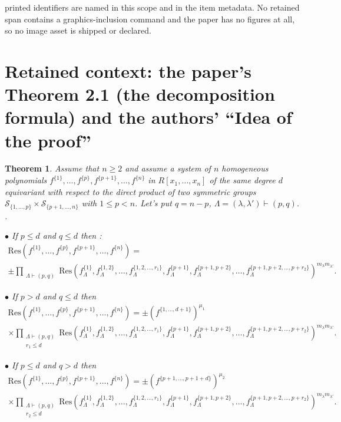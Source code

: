 \documentclass[10pt,a4paper]{amsart}
\newcommand{\Res}{\mathrm{Res}}
\newtheorem{theorem}{Theorem}
\begin{document}
printed identifiers are named in this scope and in the item metadata. No retained span contains a graphics-inclusion command and the paper has no figures at all, so no image asset is shipped or declared.
\section*{Retained context: the paper's Theorem 2.1 (the decomposition formula) and the authors' ``Idea of the proof''}
\begin{theorem}\label{thm:maintheorem} Assume that $n\geq 2$ and  assume a system of $n$ homogeneous polynomials $f^{\{1\}},\ldots, f^{\{p\}}, f^{\{p+1\}},\ldots, f^{\{n\}}$ in $R[x_1,\ldots,x_n]$ of the same degree $d$ equivariant with respect to the direct product of two symmetric groups  $\mathcal{S}_{\{1
,\ldots,p\}}\times\mathcal{S}_{\{p+1
,\ldots,n\}} $ with $1\leq p<n$. Let's put $q=n-p$, $\Lambda=(\lambda, \lambda')\vdash (p, q)$. 
. 

\noindent $\bullet$ If $p\leq d$ and $q\leq d$ then :
\begin{multline*}
\Res\left(f^{\{1\}},\ldots,f^{\{p\}},f^{\{p+1\}},\ldots,f^{\{n\}}\right)=\\ \pm
 \prod_{\substack{\Lambda\vdash (p,q)}}
\Res\left( f_{\Lambda}^{\{1\}}, f_{\Lambda}^{\{1,2\}}, \ldots, f_{\Lambda}^{\{1,2,\ldots,r_1\}},f_{\Lambda}^{\{p+1\}}, f_{\Lambda}^{\{p+1,p+2\}}, \ldots, f_{\Lambda}^{\{p+1,p+2,\ldots,p+r_2\}} 
\right)^{m_{\lambda}m_{\lambda'}}.
\end{multline*}


\noindent $\bullet$ If $p> d$ and $q\leq d$ then
\begin{multline*}
\Res\left(f^{\{1\}},\ldots,f^{\{p\}},f^{\{p+1\}},\ldots,f^{\{n\}}\right)=
 \pm \left(f^{\{1,\ldots,d+1\}}\right)^{\mu_1}\\ \times\prod_{\substack{\Lambda\vdash (p,q)\\ r_1\leq d}}
\Res\left( f_{\Lambda}^{\{1\}}, f_{\Lambda}^{\{1,2\}}, \ldots, f_{\Lambda}^{\{1,2,\ldots,r_1\}},f_{\Lambda}^{\{p+1\}}, f_{\Lambda}^{\{p+1,p+2\}}, \ldots, f_{\Lambda}^{\{p+1,p+2,\ldots,p+r_2\}} 
\right)^{m_{\lambda}m_{\lambda'}}.
\end{multline*}


\noindent $\bullet$ If $p\leq d$ and $q> d$ then
\begin{multline*}
\Res\left(f^{\{1\}},\ldots,f^{\{p\}},f^{\{p+1\}},\ldots,f^{\{n\}}\right)=
 \pm \left(f^{\{p+1,\ldots,p+1+d\}}\right)^{\mu_2}\\ \times\prod_{\substack{\Lambda\vdash (p,q)\\ r_2\leq d}}
\Res\left( f_{\Lambda}^{\{1\}}, f_{\Lambda}^{\{1,2\}}, \ldots, f_{\Lambda}^{\{1,2,\ldots,r_1\}},f_{\Lambda}^{\{p+1\}}, f_{\Lambda}^{\{p+1,p+2\}}, \ldots, f_{\Lambda}^{\{p+1,p+2,\ldots,p+r_2\}} 
\right)^{m_{\lambda}m_{\lambda'}}.
\end{multline*}


\end{theorem}
\end{document}
